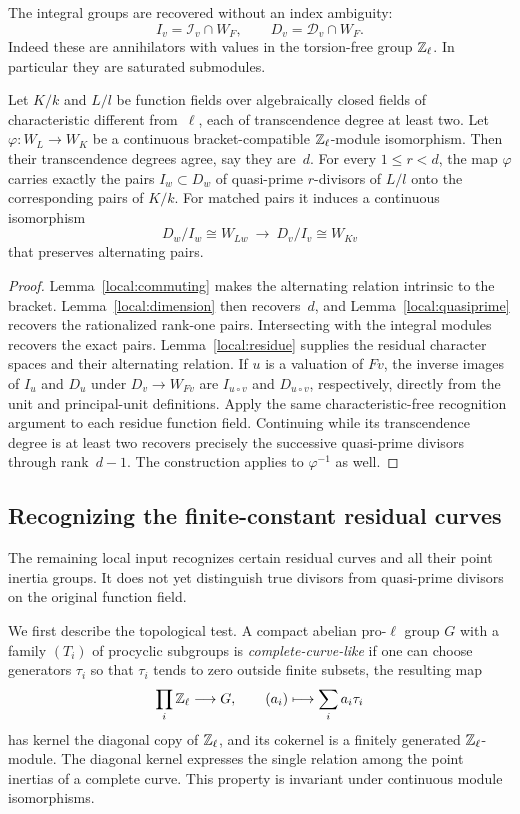 The integral groups are recovered without an index ambiguity:
\[
 I_v=\mathcal I_v\cap W_F,
 \qquad D_v=\mathcal D_v\cap W_F.
\]
Indeed these are annihilators with values in the torsion-free group
$\mathbb Z_\ell$.  In particular they are saturated submodules.

\begin{proposition}\label{local:transport}
Let $K/k$ and $L/l$ be function fields over algebraically closed
fields of characteristic different from~$\ell$, each of
transcendence degree at least two.  Let
$\varphi:W_L\to W_K$ be a continuous bracket-compatible
$\mathbb Z_\ell$-module isomorphism.  Then their transcendence degrees agree,
say they are~$d$.  For every $1\leq r<d$, the map $\varphi$ carries
exactly the pairs $I_w\subset D_w$ of quasi-prime $r$-divisors of
$L/l$ onto the corresponding pairs of $K/k$.
For matched pairs it induces a continuous isomorphism
\[
 D_w/I_w\cong W_{Lw}\ \longrightarrow\
 D_v/I_v\cong W_{Kv}
\]
that preserves alternating pairs.
\end{proposition}

\begin{proof}
Lemma~\ref{local:commuting} makes the alternating relation intrinsic
to the bracket.  Lemma~\ref{local:dimension} then recovers~$d$, and
Lemma~\ref{local:quasiprime} recovers the rationalized rank-one
pairs.  Intersecting with the integral modules recovers the exact
pairs.  Lemma~\ref{local:residue} supplies the residual character
spaces and their alternating relation.  If $u$ is a valuation of $Fv$,
the inverse images of $I_u$ and $D_u$ under $D_v\to W_{Fv}$ are
$I_{u\circ v}$ and $D_{u\circ v}$, respectively, directly from the
unit and principal-unit definitions.  Apply the same
characteristic-free recognition argument to each residue function
field.  Continuing while its transcendence degree is at least two
recovers precisely the successive quasi-prime divisors through
rank~$d-1$.  The construction applies to $\varphi^{-1}$ as well.
\end{proof}

\subsection{Recognizing the finite-constant residual curves}

The remaining local input recognizes certain residual curves and all
their point inertia groups.  It does not yet distinguish true
divisors from quasi-prime divisors on the original function field.

We first describe the topological test.  A compact abelian
pro-$\ell$ group $G$ with a family $(T_i)$ of procyclic subgroups is
\emph{complete-curve-like} if one can choose generators $\tau_i$ so
that $\tau_i$ tends to zero outside finite subsets, the resulting map
\[
 \prod_i\mathbb Z_\ell\longrightarrow G,
 \qquad(a_i)\longmapsto\sum_i a_i\tau_i
\]
has kernel the diagonal copy of $\mathbb Z_\ell$, and its cokernel is a
finitely generated $\mathbb Z_\ell$-module.  The diagonal kernel expresses
the single relation among the point inertias of a complete curve.
This property is invariant under continuous module isomorphisms.

